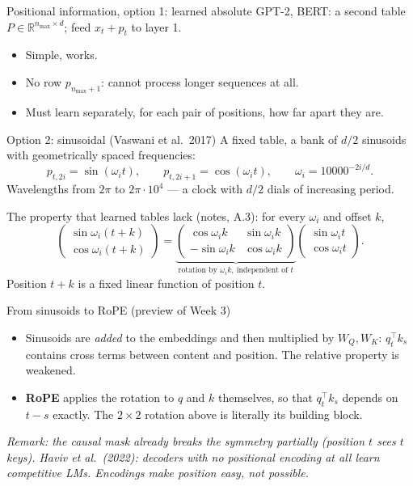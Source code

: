 \documentclass[11pt,aspectratio=169]{beamer}
\newcommand{\R}{\mathbb{R}}
\newcommand{\T}{^{\top}}
\newcommand{\dest}[1]{\textcolor{structure}{\textbf{#1}}}
\newcommand{\hook}[1]{{\small\textcolor{gray!60!black}{\textit{#1}}}}
\begin{document}
\begin{frame}{Positional information, option 1: learned absolute}
  GPT-2, BERT: a second table $P\in\R^{n_{\max}\times d}$; feed $x_t + p_t$ to layer 1.

  \vspace{0.8em}
  \begin{itemize}
    \item Simple, works.
    \item No row $p_{n_{\max}+1}$: cannot process longer sequences at all.
    \item Must learn separately, for each pair of positions, how far apart they are.
  \end{itemize}
\end{frame}

\begin{frame}{Option 2: sinusoidal (Vaswani et al.\ 2017)}
  A fixed table, a bank of $d/2$ sinusoids with geometrically spaced frequencies:
  \[
    p_{t,2i} = \sin(\omega_it),\qquad p_{t,2i+1} = \cos(\omega_it),\qquad
    \omega_i = 10000^{-2i/d}.
  \]
  Wavelengths from $2\pi$ to $2\pi\cdot 10^4$ --- a clock with $d/2$ dials of increasing
  period.

  \vspace{0.8em}
  The property that learned tables lack (notes, A.3): for every $\omega_i$ and offset $k$,
  \[
    \begin{pmatrix}\sin\omega_i(t+k)\\ \cos\omega_i(t+k)\end{pmatrix}
    = \underbrace{\begin{pmatrix}\cos\omega_ik & \sin\omega_ik\\ -\sin\omega_ik & \cos\omega_ik\end{pmatrix}}_{\text{rotation by }\omega_ik,\ \text{independent of }t}
    \begin{pmatrix}\sin\omega_it\\ \cos\omega_it\end{pmatrix}.
  \]
  Position $t+k$ is a fixed linear function of position $t$.
\end{frame}

\begin{frame}{From sinusoids to RoPE (preview of Week 3)}
  \begin{itemize}
    \item Sinusoids are \emph{added} to the embeddings and then multiplied by $W_Q, W_K$:
          $q_t\T k_s$ contains cross terms between content and position. The relative
          property is weakened.
    \item \dest{RoPE} applies the rotation to $q$ and $k$ themselves, so that
          $q_t\T k_s$ depends on $t - s$ exactly. The $2\times 2$ rotation above is literally
          its building block.
  \end{itemize}

  \vspace{1em}
  \hook{Remark: the causal mask already breaks the symmetry partially (position $t$ sees
  $t$ keys). Haviv et al.\ (2022): decoders with no positional encoding at all learn
  competitive LMs. Encodings make position easy, not possible.}
\end{frame}
\end{document}
